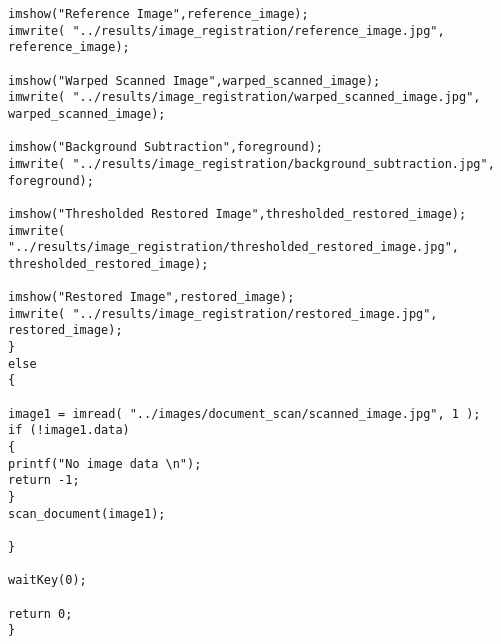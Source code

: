\begin{lstlisting}
imshow("Reference Image",reference_image);
imwrite( "../results/image_registration/reference_image.jpg", reference_image);

imshow("Warped Scanned Image",warped_scanned_image);
imwrite( "../results/image_registration/warped_scanned_image.jpg", warped_scanned_image);

imshow("Background Subtraction",foreground);
imwrite( "../results/image_registration/background_subtraction.jpg", foreground);

imshow("Thresholded Restored Image",thresholded_restored_image);
imwrite( "../results/image_registration/thresholded_restored_image.jpg", thresholded_restored_image);

imshow("Restored Image",restored_image);
imwrite( "../results/image_registration/restored_image.jpg", restored_image);
}
else
{

image1 = imread( "../images/document_scan/scanned_image.jpg", 1 );
if (!image1.data)
{
printf("No image data \n");
return -1;
}
scan_document(image1);

}

waitKey(0);

return 0;
}

\end{lstlisting}
